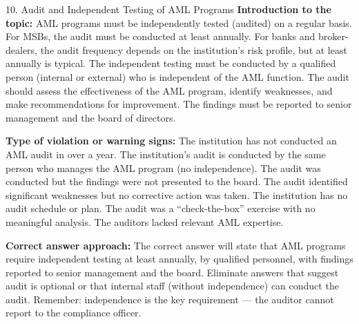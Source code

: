 \documentclass[11pt,a4paper]{beamer}
\begin{document}
\begin{frame}{10. Audit and Independent Testing of AML Programs}
\tiny
\noindent\textbf{Introduction to the topic:} AML programs must be independently tested (audited) on a regular basis. For MSBs, the audit must be conducted at least annually. For banks and broker-dealers, the audit frequency depends on the institution's risk profile, but at least annually is typical. The independent testing must be conducted by a qualified person (internal or external) who is independent of the AML function. The audit should assess the effectiveness of the AML program, identify weaknesses, and make recommendations for improvement. The findings must be reported to senior management and the board of directors.

\vspace{0.1cm}
\noindent\textbf{Type of violation or warning signs:} The institution has not conducted an AML audit in over a year. The institution's audit is conducted by the same person who manages the AML program (no independence). The audit was conducted but the findings were not presented to the board. The audit identified significant weaknesses but no corrective action was taken. The institution has no audit schedule or plan. The audit was a “check-the-box” exercise with no meaningful analysis. The auditors lacked relevant AML expertise.

\vspace{0.1cm}
\noindent\textbf{Correct answer approach:} The correct answer will state that AML programs require independent testing at least annually, by qualified personnel, with findings reported to senior management and the board. Eliminate answers that suggest audit is optional or that internal staff (without independence) can conduct the audit. Remember: independence is the key requirement — the auditor cannot report to the compliance officer.
\end{frame}
\end{document}
